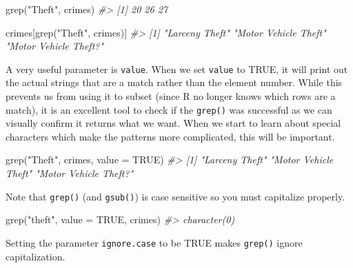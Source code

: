 \documentclass[
]{krantz}
\makeatletter
\newenvironment{Shaded}{\begin{snugshade}}{\end{snugshade}}
\newcommand{\AttributeTok}[1]{\textcolor[rgb]{0.61,0.61,0.61}{#1}}
\newcommand{\CommentTok}[1]{\textcolor[rgb]{0.37,0.37,0.37}{\textit{#1}}}
\newcommand{\ConstantTok}[1]{\textcolor[rgb]{0,0,0}{#1}}
\newcommand{\FunctionTok}[1]{\textcolor[rgb]{0,0,0}{#1}}
\newcommand{\NormalTok}[1]{#1}
\newcommand{\StringTok}[1]{\textcolor[rgb]{0.5,0.5,0.5}{#1}}
\newenvironment{kframe}{%
\medskip{}
\setlength{\fboxsep}{.8em}
 \def\at@end@of@kframe{}%
 \ifinner\ifhmode%
  \def\at@end@of@kframe{\end{minipage}}%
  \begin{minipage}{\columnwidth}%
 \fi\fi%
 \def\FrameCommand##1{\hskip\@totalleftmargin \hskip-\fboxsep
 \colorbox{shadecolor}{##1}\hskip-\fboxsep
     \hskip-\linewidth \hskip-\@totalleftmargin \hskip\columnwidth}%
 \MakeFramed {\advance\hsize-\width
   \@totalleftmargin\z@ \linewidth\hsize
   \@setminipage}}%
 {\par\unskip\endMakeFramed%
 \at@end@of@kframe}
\renewenvironment{Shaded}{\begin{kframe}}{\end{kframe}}
\makeatother
\begin{document}
\begin{Shaded}
\begin{Highlighting}[]
\FunctionTok{grep}\NormalTok{(}\StringTok{"Theft"}\NormalTok{, crimes)}
\CommentTok{\#\textgreater{} [1] 20 26 27}
\end{Highlighting}
\end{Shaded}

\begin{Shaded}
\begin{Highlighting}[]
\NormalTok{crimes[}\FunctionTok{grep}\NormalTok{(}\StringTok{"Theft"}\NormalTok{, crimes)]}
\CommentTok{\#\textgreater{} [1] "Larceny Theft"        "Motor Vehicle Theft"  "Motor Vehicle Theft?"}
\end{Highlighting}
\end{Shaded}

A very useful parameter is \texttt{value}. When we set \texttt{value} to TRUE, it will print out the actual strings that are a match rather than the element number. While this prevents us from using it to subset (since R no longer knows which rows are a match), it is an excellent tool to check if the \texttt{grep()} was successful as we can visually confirm it returns what we want. When we start to learn about special characters which make the patterns more complicated, this will be important.

\begin{Shaded}
\begin{Highlighting}[]
\FunctionTok{grep}\NormalTok{(}\StringTok{"Theft"}\NormalTok{, crimes, }\AttributeTok{value =} \ConstantTok{TRUE}\NormalTok{)}
\CommentTok{\#\textgreater{} [1] "Larceny Theft"        "Motor Vehicle Theft"  "Motor Vehicle Theft?"}
\end{Highlighting}
\end{Shaded}

Note that \texttt{grep()} (and \texttt{gsub()}) is case sensitive so you must capitalize properly.

\begin{Shaded}
\begin{Highlighting}[]
\FunctionTok{grep}\NormalTok{(}\StringTok{"theft"}\NormalTok{, }\AttributeTok{value =} \ConstantTok{TRUE}\NormalTok{, crimes)}
\CommentTok{\#\textgreater{} character(0)}
\end{Highlighting}
\end{Shaded}

Setting the parameter \texttt{ignore.case} to be TRUE makes \texttt{grep()} ignore capitalization.
\end{document}
